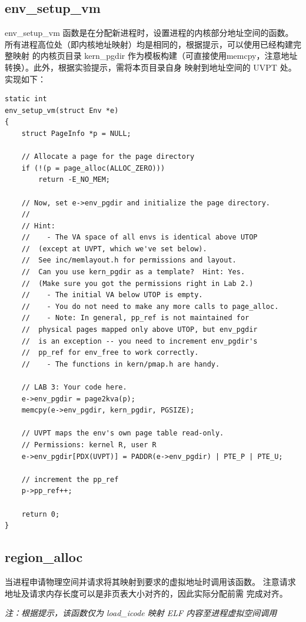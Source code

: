 \documentclass[12pt, letterpaper]{report}
\begin{document}
\newpage
\subsection{\large env\_setup\_vm}
env\_setup\_vm 函数是在分配新进程时，设置进程的内核部分地址空间的函数。
所有进程高位处（即内核地址映射）均是相同的，根据提示，可以使用已经构建完整映射
的内核页目录 kern\_pgdir 作为模板构建（可直接使用memcpy，注意地址转换）。此外，根据实验提示，需将本页目录自身
映射到地址空间的 UVPT 处。实现如下：\par 

\lstset{style=CStyle}
\setmainfont{Consolas}
\begin{lstlisting}
static int
env_setup_vm(struct Env *e)
{
    struct PageInfo *p = NULL;

    // Allocate a page for the page directory
    if (!(p = page_alloc(ALLOC_ZERO)))
        return -E_NO_MEM;

    // Now, set e->env_pgdir and initialize the page directory.
    //
    // Hint:
    //    - The VA space of all envs is identical above UTOP
    //	(except at UVPT, which we've set below).
    //	See inc/memlayout.h for permissions and layout.
    //	Can you use kern_pgdir as a template?  Hint: Yes.
    //	(Make sure you got the permissions right in Lab 2.)
    //    - The initial VA below UTOP is empty.
    //    - You do not need to make any more calls to page_alloc.
    //    - Note: In general, pp_ref is not maintained for
    //	physical pages mapped only above UTOP, but env_pgdir
    //	is an exception -- you need to increment env_pgdir's
    //	pp_ref for env_free to work correctly.
    //    - The functions in kern/pmap.h are handy.

    // LAB 3: Your code here.
    e->env_pgdir = page2kva(p);
    memcpy(e->env_pgdir, kern_pgdir, PGSIZE);

    // UVPT maps the env's own page table read-only.
    // Permissions: kernel R, user R
    e->env_pgdir[PDX(UVPT)] = PADDR(e->env_pgdir) | PTE_P | PTE_U;
    
    // increment the pp_ref
    p->pp_ref++;

    return 0;
}
\end{lstlisting}
\setmainfont{Times New Roman}

\newpage
\subsection{\large region\_alloc}
当进程申请物理空间并请求将其映射到要求的虚拟地址时调用该函数。
注意请求地址及请求内存长度可以是非页表大小对齐的，因此实际分配前需
完成对齐。\par 
\textsl{注：根据提示，该函数仅为 load\_icode 映射 ELF 内容至进程虚拟空间调用}
\end{document}
